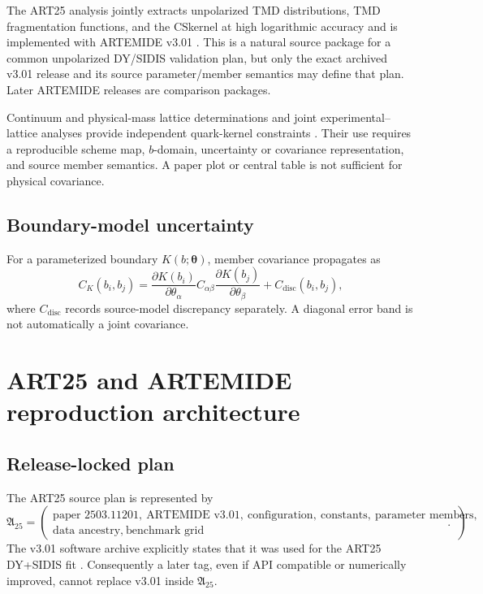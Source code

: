 \documentclass[11pt]{article}
\newcommand{\CS}{\ensuremath{\mathrm{CS}}}
\begin{document}
The ART25 analysis jointly extracts unpolarized TMD distributions, TMD fragmentation functions, and the \CS kernel at high logarithmic accuracy and is implemented with ARTEMIDE v3.01 \cite{Moos2025,ARTEMIDE301}.  This is a natural source package for a common unpolarized DY/SIDIS validation plan, but only the exact archived v3.01 release and its source parameter/member semantics may define that plan.  Later ARTEMIDE releases are comparison packages.

Continuum and physical-mass lattice determinations and joint experimental--lattice analyses provide independent quark-kernel constraints \cite{Tan2025,Avkhadiev2025,Avkhadiev2024}.  Their use requires a reproducible scheme map, \(b\)-domain, uncertainty or covariance representation, and source member semantics.  A paper plot or central table is not sufficient for physical covariance.

\subsection{Boundary-model uncertainty}

For a parameterized boundary \(K(b;\bm\theta)\), member covariance propagates as
\begin{equation}
 C_K(b_i,b_j)
 =
 \frac{\partial K(b_i)}{\partial\theta_\alpha}
 C_{\alpha\beta}
 \frac{\partial K(b_j)}{\partial\theta_\beta}
 +C_{\mathrm{disc}}(b_i,b_j),
 \label{eq:kernel-covariance}
\end{equation}
where \(C_{\mathrm{disc}}\) records source-model discrepancy separately.  A diagonal error band is not automatically a joint covariance.

\section{ART25 and ARTEMIDE reproduction architecture}
\label{sec:artemide}

\subsection{Release-locked plan}

The ART25 source plan is represented by
\begin{equation}
 \mathfrak A_{25}
 =
 \left(
 \begin{gathered}
 \text{paper 2503.11201},\ \text{ARTEMIDE v3.01},\
 \text{configuration},\ \text{constants},\ \text{parameter members},\\
 \text{data ancestry},\ \text{benchmark grid}
 \end{gathered}
 \right).
 \label{eq:art25-plan}
\end{equation}
The v3.01 software archive explicitly states that it was used for the ART25 DY+SIDIS fit \cite{ARTEMIDE301}.  Consequently a later tag, even if API compatible or numerically improved, cannot replace v3.01 inside \(\mathfrak A_{25}\).
\end{document}
